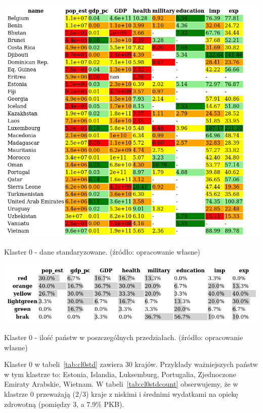 \documentclass[11pt]{report}
\begin{document}
    \begin{table}[!htp]
        \centering
        \includegraphics[width=\linewidth]{tables/CLUST/cluster0stdkmeans.png}
        \caption{Klaster 0 - dane standaryzowane. (źródło: opracowanie własne)}
        \label{tab:cl0std}
    \end{table}

    \begin{table}[!htp]
        \centering
        \includegraphics[width=\linewidth]{tables/CLUST/cluster0stdkmeanscount.png}
        \caption{Klaster 0 - ilość państw w poszczególnych przedziałach. (źródło: opracowanie własne)}
        \label{tab:cl0stdcount}
    \end{table}

    Klaster 0 w tabeli~\ref{tab:cl0std} zawiera 30 krajów.
    Przykłady ważniejszych państw w tym klastrze to: Estonia, Islandia, Luksemburg, Portugalia, Zjednoczone Emiraty Arabskie, Wietnam.
    W tabeli~\ref{tab:cl0stdcount} obserwujemy, że w klastrze 0 przeważają (2/3) kraje z niskimi i średnimi wydatkami na opiekę zdrowotną (pomiędzy 3, a 7.9\% PKB).
\end{document}

